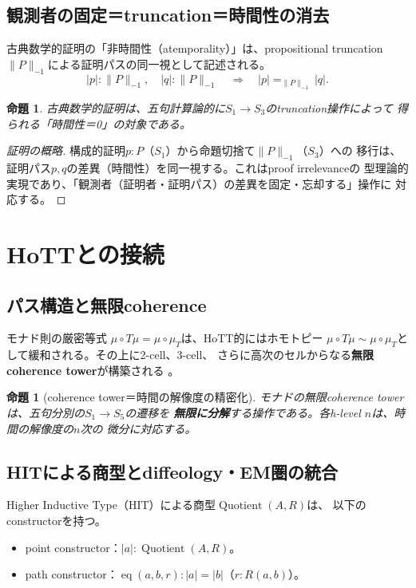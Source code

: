 \documentclass[11pt,a4paper]{ltjsarticle}
\newtheorem{proposition}[definition]{命題}
\theoremstyle{remark}
\begin{document}
\subsection{観測者の固定＝truncation＝時間性の消去}

古典数学的証明の「非時間性（atemporality）」は、propositional truncation
$\lVert P\rVert_{-1}$による証明パスの同一視として記述される。
\[
 |p|:\lVert P\rVert_{-1},\quad |q|:\lVert P\rVert_{-1}
 \quad\Longrightarrow\quad
 |p|=_{\lVert P\rVert_{-1}}|q|.
\]

\begin{proposition}
古典数学的証明は、五句計算論的に$S_1\to S_3$のtruncation操作によって
得られる「時間性＝0」の対象である。
\end{proposition}

\begin{proof}[証明の概略]
構成的証明$p:P$（$S_1$）から命題切捨て$\lVert P\rVert_{-1}$（$S_3$）への
移行は、証明パス$p,q$の差異（時間性）を同一視する。これはproof irrelevanceの
型理論的実現であり、「観測者（証明者・証明パス）の差異を固定・忘却する」操作に
対応する。
\end{proof}

\section{HoTTとの接続}

\subsection{パス構造と無限coherence}

モナド則の厳密等式
$\mu\circ T\mu=\mu\circ\mu_T$は、HoTT的にはホモトピー
$\mu\circ T\mu\sim\mu\circ\mu_T$として緩和される。その上に2-cell、3-cell、
さらに高次のセルからなる\textbf{無限coherence tower}が構築される
\cite{RiehlVerity2015}。

\begin{proposition}[coherence tower＝時間の解像度の精密化]
モナドの無限coherence towerは、五句分別の$S_1\to S_5$の遷移を
\textbf{無限に分解}する操作である。各h-level $n$は、時間の解像度の$n$次の
微分に対応する。
\end{proposition}

\subsection{HITによる商型とdiffeology・EM圏の統合}

Higher Inductive Type（HIT）による商型$\operatorname{Quotient}(A,R)$は、
以下のconstructorを持つ。
\begin{itemize}
  \item point constructor：$|a|:\operatorname{Quotient}(A,R)$。
  \item path constructor：$\operatorname{eq}(a,b,r):|a|=|b|$（$r:R(a,b)$）。
\end{itemize}
\end{document}
